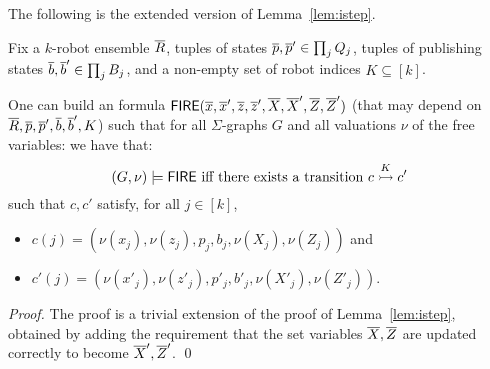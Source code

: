 The following is the extended version of Lemma~\ref{lem:istep}.
\begin{lemma} \label{lem:ext:istep}
Fix a $k$-robot ensemble $\tup{R}$, tuples of states $\tup{p},\tup{p}' \in \prod_j Q_j$, tuples of publishing states
$\tup{b},\tup{b}' \in \prod_j B_j$, and a non-empty set of robot indices $K \subseteq [k]$.

One can build an \msol formula $\extfire(\tup{x},\tup{x}',\tup{z},\tup{z}',\tup{X},\tup{X}',\tup{Z},\tup{Z}')$ (that may depend on $\tup{R}, \tup{p}, \tup{p}', \tup{b}, \tup{b}', K$)
such that for all $\Sigma$-graphs $G$ and all valuations $\nu$ of the free variables:
we have that:
\[
 (G,\nu) \models \extfire \mbox{ iff there exists a transition } \onestep{c}{c'}{K}
\]
such that $c,c'$ satisfy, for all $j \in [k]$,
\begin{itemize}
 \item $c(j) = 	(\nu(x_j),	\nu(z_j),		p_j,		b_j,\nu(X_j),\nu(Z_j))$ and
 \item $c'(j) =	(\nu(x'_j),	\nu(z'_j),	p'_j,	b'_j,\nu(X'_j), \nu(Z'_j))$.
\end{itemize}
\end{lemma}

\begin{proof}
 The proof is a trivial extension of the proof of Lemma~\ref{lem:istep}, obtained by adding the requirement that the set variables $\tup{X},\tup{Z}$ are updated correctly to become $\tup{X}',\tup{Z}'$.
 \qed
\end{proof}

%


